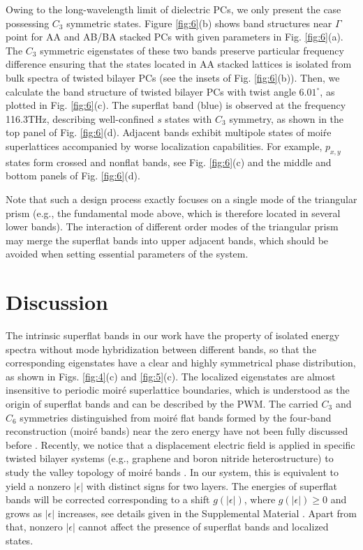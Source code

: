 \documentclass[%
reprint,
amsmath,amssymb,amsfonts
aps,
superscriptaddress,
prx
]{revtex4-1}
\begin{document}
Owing to the long-wavelength limit of dielectric PCs, we only present the case possessing $C_3$ symmetric states. Figure \ref{fig:6}(b) shows band structures near $\Gamma$ point for AA and AB/BA stacked PCs with given parameters in Fig. \ref{fig:6}(a). The $C_3$ symmetric eigenstates of these two bands preserve particular frequency difference ensuring that the states located in AA stacked lattices is isolated from bulk spectra of twisted bilayer PCs (see the insets of Fig. \ref{fig:6}(b)). Then, we calculate the band structure of twisted bilayer PCs with twist angle $6.01^{\circ}$, as plotted in Fig. \ref{fig:6}(c). The superflat band (blue) is observed at the frequency 116.3THz, describing well-confined $s$ states with $C_3$ symmetry, as shown in the top panel of Fig. \ref{fig:6}(d). Adjacent bands exhibit multipole states of moi\'re superlattices accompanied by worse localization capabilities. For example, $p_{x,y}$ states form crossed and nonflat bands, see Fig. \ref{fig:6}(c) and the middle and bottom panels of Fig. \ref{fig:6}(d). 

Note that such a design process exactly focuses on a single mode of the triangular prism (e.g., the fundamental mode above, which is therefore located in several lower bands). The interaction of different order modes of the triangular prism may merge the superflat bands into upper adjacent bands, which should be avoided when setting essential parameters of the system. 

\section{Discussion} 
The intrinsic superflat bands in our work have the property of isolated energy spectra without mode hybridization between different bands, so that the corresponding eigenstates have a clear and highly symmetrical phase distribution, as shown in Figs. \ref{fig:4}(c) and \ref{fig:5}(c). The localized eigenstates are almost insensitive to periodic moir\'e superlattice boundaries, which is understood as the origin of superflat bands and can be described by the PWM. The carried $C_3$ and $C_6$ symmetries distinguished from moir\'e flat bands formed by the four-band reconstruction (moir\'e bands) near the zero energy have not been fully discussed before \cite{cond1_graphene,cond2_graphene,cond3_graphene,magic1}. Recently, we notice that a displacement electric field is applied in specific twisted bilayer systems (e.g., graphene and boron nitride heterostructure) to study the valley topology of moir\'e bands \cite{valley1,valley2}. In our system, this is equivalent to yield a nonzero $|\epsilon|$ with distinct signs for two layers. The energies of superflat bands will be corrected corresponding to a shift $g(|\epsilon|)$, where $g(|\epsilon|)\ge0$ and grows as $|\epsilon|$ increases, see details given in the Supplemental Material \cite{SM_file}. Apart from that, nonzero $|\epsilon|$ cannot affect the presence of superflat bands and localized states.
\end{document}
